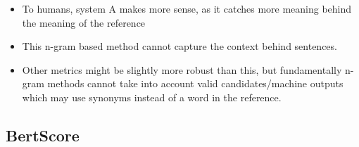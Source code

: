 \documentclass[11pt]{article}
\begin{document}
\begin{minipage}[l]{.5\linewidth}
    \centering
\end{minipage}\hfill
\begin{minipage}[r]{.5\linewidth}
    \begin{itemize}
        \item To humans, system A makes more sense, as it catches more meaning behind the meaning of the reference
        \item This n-gram based method cannot capture the context behind sentences.
        \item Other metrics might be slightly more robust than this, but fundamentally n-gram methods cannot take into account valid candidates/machine outputs which may use synonyms instead of a word in the reference.
    \end{itemize}
\end{minipage}

\subsection{BertScore}
\end{document}
